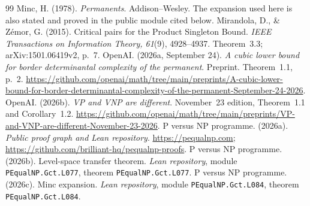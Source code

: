 \documentclass[11pt]{article}
\theoremstyle{definition}
\theoremstyle{remark}
\begin{document}
\begin{thebibliography}{99}
 Minc, H. (1978). \emph{Permanents}. Addison--Wesley. The expansion used here is also stated and proved in the public module cited below.
 Mirandola, D., \& Z\'emor, G. (2015). Critical pairs for the Product Singleton Bound. \emph{IEEE Transactions on Information Theory, 61}(9), 4928--4937. Theorem~3.3; arXiv:1501.06419v2, p.~7.
 OpenAI. (2026a, September 24). \emph{A cubic lower bound for border determinantal complexity of the permanent}. Preprint. Theorem~1.1, p.~2. \url{https://github.com/openai/math/tree/main/preprints/A-cubic-lower-bound-for-border-determinantal-complexity-of-the-permanent-September-24-2026}.
 OpenAI. (2026b). \emph{VP and VNP are different}. November~23 edition, Theorem~1.1 and Corollary~1.2. \url{https://github.com/openai/math/tree/main/preprints/VP-and-VNP-are-different-November-23-2026}.
 P versus NP programme. (2026a). \emph{Public proof graph and Lean repository}. \url{https://pequalnp.com}; \url{https://github.com/brilliant-hq/pequalnp-proofs}.
 P versus NP programme. (2026b). Level-space transfer theorem. \emph{Lean repository}, module \texttt{PEqualNP.Gct.L077}, theorem \texttt{PEqualNP.Gct.L077}.
 P versus NP programme. (2026c). Minc expansion. \emph{Lean repository}, module \texttt{PEqualNP.Gct.L084}, theorem \texttt{PEqualNP.Gct.L084}.
\end{thebibliography}
\end{document}
